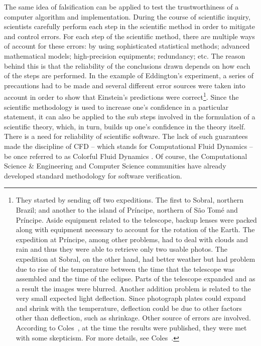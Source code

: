The same idea of falsification can be applied to test the trustworthiness of a computer algorithm and implementation. During the course of scientific inquiry, scientists carefully perform each step in the scientific method in order to mitigate and control errors. For each step of the scientific method, there are multiple ways of account for these errors: by using sophisticated statistical methods; advanced mathematical models; high-precision equipments; redundancy; etc.  The reason behind this is that the reliability of the conclusions drawn depends on how each of the steps are performed. In the example of Eddington's experiment, a series of precautions had to be made and several different error sources were taken into account in order to show that Einstein's predictions were correct\footnote{They started by sending off two expeditions. The first to Sobral, northern Brazil; and another to the island of Pr\'incipe, northern of S\~ao Tom\'e and Pr\'incipe. Aside equipment related to the telescope, backup lenses were packed along with equipment necessary to account for the rotation of the Earth. The expedition at Pr\'incipe, among other problems, had to deal with clouds and rain and thus they were able to retrieve only two usable photos. The expedition at Sobral, on the other hand, had better weather but had problem due to rise of the temperature between the time that the telescope was assembled and the time of the eclipse. Parts of the telescope expanded and as a result the images were blurred. Another addition problem is related to the very small expected light deflection. Since photograph plates could expand and shrink with the temperature, deflection could be due to other factors other than deflection, such as shrinkage. Other source of errors are involved. According to Coles~\cite{coles2001einstein}, at the time the results were published, they were met with some skepticism. For more details, see Coles~\cite{coles2001einstein}.}. 
%
Since the scientific methodology is used to increase one's confidence in a particular statement, it can also be applied to the sub steps involved in the formulation of a scientific theory, which, in turn, builds up one's confidence in the theory itself. 
There is a need for reliability of scientific software. The lack of such guarantees made the discipline of CFD -- which stands for Computational Fluid Dynamics -- be once referred to as Colorful Fluid Dynamics \cite{meroney2004wind}. Of course, the Computational Science \& Engineering and Computer Science communities have already developed standard methodology for software verification.

